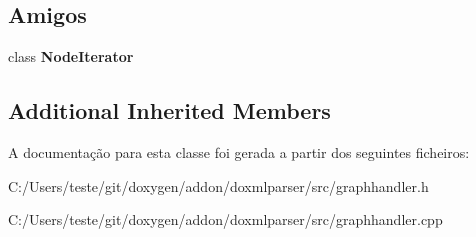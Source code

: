 \subsection*{Amigos}
\begin{DoxyCompactItemize}
\item 
\hypertarget{class_graph_handler_ac5a1d2c6036b7ba1894a7c3b8d96a312}{class {\bfseries Node\-Iterator}}\label{class_graph_handler_ac5a1d2c6036b7ba1894a7c3b8d96a312}

\end{DoxyCompactItemize}
\subsection*{Additional Inherited Members}


A documentação para esta classe foi gerada a partir dos seguintes ficheiros\-:\begin{DoxyCompactItemize}
\item 
C\-:/\-Users/teste/git/doxygen/addon/doxmlparser/src/graphhandler.\-h\item 
C\-:/\-Users/teste/git/doxygen/addon/doxmlparser/src/graphhandler.\-cpp\end{DoxyCompactItemize}

